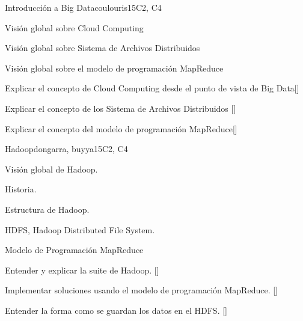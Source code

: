\begin{syllabus}
\begin{unit}{Introducción a Big Data}{}{coulouris}{15}{C2, C4}
\begin{topics}%
        \item Visión global sobre Cloud Computing
        \item Visión global sobre Sistema de Archivos Distribuidos%
        \item Visión global sobre el modelo de programación MapReduce%
\end{topics}
\begin{learningoutcomes}%
        \item Explicar el concepto de Cloud Computing desde el punto de vista de Big Data[\Familiarity] %
        \item Explicar el concepto de los Sistema de Archivos Distribuidos [\Familiarity] %
        \item Explicar el concepto del modelo de programación MapReduce[\Familiarity] %
\end{learningoutcomes}%
\end{unit}

\begin{unit}{Hadoop}{}{dongarra, buyya}{15}{C2, C4}
\begin{topics}
    \item Visión global de Hadoop.
    \item Historia.
    \item Estructura de Hadoop.
    \item HDFS, Hadoop Distributed File System.
    \item Modelo de Programación MapReduce
\end{topics}
\begin{learningoutcomes}
      \item Entender y explicar la suite de Hadoop. [\Familiarity]
      \item Implementar soluciones usando el modelo de programación MapReduce. [\Usage]
      \item Entender la forma como se guardan los datos en el HDFS. [\Familiarity] %
\end{learningoutcomes}
\end{unit}


\end{syllabus}
